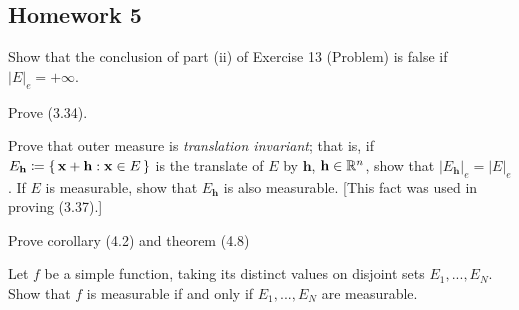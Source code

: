 \subsection{Homework 5}
\begin{problem}
Show that the conclusion of part  (ii) of Exercise 13 (Problem) is false if
$|E|_e=+\infty$.
\end{problem}
\begin{solution}
\end{solution}

\begin{problem}
Prove (3.34).
\end{problem}
\begin{solution}
\end{solution}

\begin{problem}
Prove that outer measure is \emph{translation invariant}; that is, if
$E_{\textbf{h}}\coloneq\left\{\,\mathbf{x}+\mathbf{h}:\mathbf{x}\in
  E\,\right\}$ is the translate of $E$ by $\mathbf{h}$,
$\mathbf{h}\in\mathbb{R}^n$, show that
$|E_{\mathbf{h}}|_e=|E|_e$. If $E$ is measurable,
show that $E_{\mathbf{h}}$ is also measurable. [This fact was used in
proving (3.37).]
\end{problem}
\begin{solution}
\end{solution}

\begin{problem}
Prove corollary (4.2) and theorem (4.8)
\end{problem}
\begin{solution}
\end{solution}

\begin{problem}
Let $f$ be a simple function, taking its distinct values on disjoint sets
$E_1,...,E_N$. Show that $f$ is measurable if and only if $E_1,...,E_N$ are
measurable.
\end{problem}
\begin{solution}
\end{solution}

